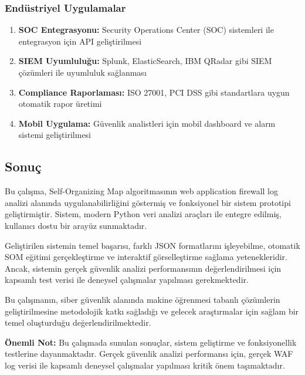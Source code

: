 \newpage

\subsubsection{Endüstriyel Uygulamalar}

\begin{enumerate}
    \item \textbf{SOC Entegrasyonu:} Security Operations Center (SOC) sistemleri ile entegrasyon için API geliştirilmesi
    
    \item \textbf{SIEM Uyumluluğu:} Splunk, ElasticSearch, IBM QRadar gibi SIEM çözümleri ile uyumluluk sağlanması
    
    \item \textbf{Compliance Raporlaması:} ISO 27001, PCI DSS gibi standartlara uygun otomatik rapor üretimi
    
    \item \textbf{Mobil Uygulama:} Güvenlik analistleri için mobil dashboard ve alarm sistemi geliştirilmesi
\end{enumerate}

\subsection{Sonuç}

Bu çalışma, Self-Organizing Map algoritmasının web application firewall log analizi alanında uygulanabilirliğini göstermiş ve fonksiyonel bir sistem prototipi geliştirmiştir. Sistem, modern Python veri analizi araçları ile entegre edilmiş, kullanıcı dostu bir arayüz sunmaktadır.

Geliştirilen sistemin temel başarısı, farklı JSON formatlarını işleyebilme, otomatik SOM eğitimi gerçekleştirme ve interaktif görselleştirme sağlama yetenekleridir. Ancak, sistemin gerçek güvenlik analizi performansının değerlendirilmesi için kapsamlı test verisi ile deneysel çalışmalar yapılması gerekmektedir.

Bu çalışmanın, siber güvenlik alanında makine öğrenmesi tabanlı çözümlerin geliştirilmesine metodolojik katkı sağladığı ve gelecek araştırmalar için sağlam bir temel oluşturduğu değerlendirilmektedir.

\textbf{Önemli Not:} Bu çalışmada sunulan sonuçlar, sistem geliştirme ve fonksiyonellik testlerine dayanmaktadır. Gerçek güvenlik analizi performansı için, gerçek WAF log verisi ile kapsamlı deneysel çalışmalar yapılması kritik önem taşımaktadır.



